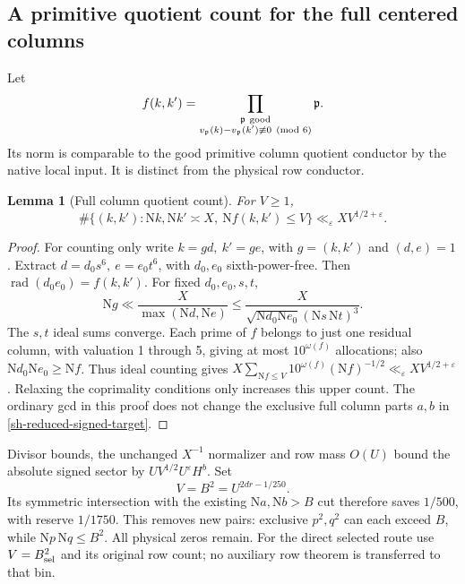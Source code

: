 \documentclass[11pt]{article}
\newtheorem{lemma}[theorem]{Lemma}
\theoremstyle{definition}
\newcommand{\N}{\mathrm N}
\newcommand{\eps}{\varepsilon}
\DeclareMathOperator{\rad}{rad}
\begin{document}
\subsection{A primitive quotient count for the full centered columns}
Let
\[
 f(k,k')=\prod_{\substack{\mathfrak p\ {\rm good}\\
 v_{\mathfrak p}(k)-v_{\mathfrak p}(k')\not\equiv0\pmod6}}
 \mathfrak p .
\]
Its norm is comparable to the good primitive column quotient conductor
by the native local input. It is distinct from the physical row conductor.

\begin{lemma}[Full column quotient count]\label{fb-quotient-count}
For $V\ge1$,
\[
 \#\{(k,k'):\N k,\N k'\asymp X,\ \N f(k,k')\le V\}
       \ll_\eps XV^{1/2+\eps}.
\]
\end{lemma}
\begin{proof}
For counting only write $k=g d,\ k'=g e$, with $g=(k,k')$
and $(d,e)=1$. Extract $d=d_0s^6,\ e=e_0t^6$, with
$d_0,e_0$ sixth-power-free. Then
$\rad(d_0e_0)=f(k,k')$. For fixed $d_0,e_0,s,t$,
\[
 \N g\ll \frac{X}{\max(\N d,\N e)}
 \le\frac{X}{\sqrt{\N d_0\N e_0}(\N s\,\N t)^3}.
\]
The $s,t$ ideal sums converge. Each prime of $f$ belongs to just
one residual column, with valuation 1 through 5, giving at most
$10^{\omega(f)}$ allocations; also $\N d_0\N e_0\ge\N f$.
Thus ideal counting gives
$X\sum_{\N f\le V}10^{\omega(f)}(\N f)^{-1/2}
\ll_\eps XV^{1/2+\eps}$.
Relaxing the coprimality conditions only increases this upper count.
The ordinary gcd in this proof does not change the exclusive full
column parts $a,b$ in \eqref{sh-reduced-signed-target}.
\end{proof}

Divisor bounds, the unchanged $X^{-1}$ normalizer and row mass $O(U)$
bound the absolute signed sector by $UV^{1/2}U^\eps H^b$.
Set
\begin{equation}\label{fb-quotient-cut}
 V=B^2=U^{2dr-1/250}.
\end{equation}
Its symmetric intersection with the existing $\N a,\N b>B$ cut
therefore saves $1/500$, with reserve $1/1750$. This removes new
pairs: exclusive $p^2,q^2$ can each exceed $B$, while
$\N p\,\N q\le B^2$. All physical zeros remain.
For the direct selected route use $V=B_{\rm sel}^2$ and its original
row count; no auxiliary row theorem is transferred to that bin.
\end{document}
